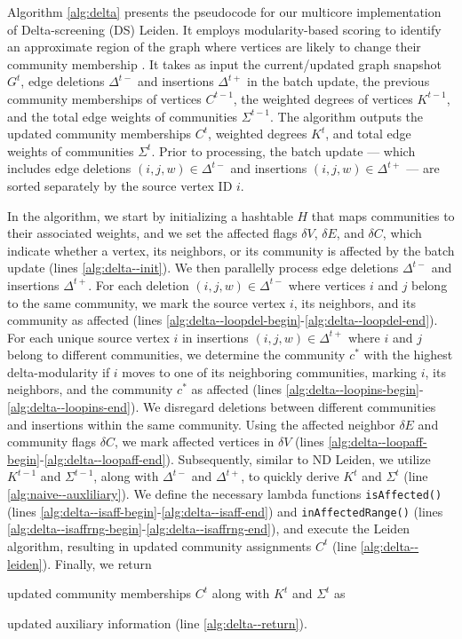 Algorithm \ref{alg:delta} presents the pseudocode for our multicore implementation of Delta-screening (DS) Leiden. It employs modularity-based scoring to identify an approximate region of the graph where vertices are likely to change their community membership \cite{com-zarayeneh21}. It takes as input the current/updated graph snapshot $G^t$, edge deletions $\Delta^{t-}$ and insertions $\Delta^{t+}$ in the batch update, the previous community memberships of vertices $C^{t-1}$, the weighted degrees of vertices $K^{t-1}$, and the total edge weights of communities $\Sigma^{t-1}$. The algorithm outputs the updated community memberships $C^t$, weighted degrees $K^t$, and total edge weights of communities $\Sigma^t$. Prior to processing, the batch update --- which includes edge deletions $(i, j, w) \in \Delta^{t-}$ and insertions $(i, j, w) \in \Delta^{t+}$ --- are sorted separately by the source vertex ID $i$.




In the algorithm, we start by initializing a hashtable $H$ that maps communities to their associated weights, and we set the affected flags $\delta V$, $\delta E$, and $\delta C$, which indicate whether a vertex, its neighbors, or its community is affected by the batch update (lines \ref{alg:delta--init}). We then parallelly process edge deletions $\Delta^{t-}$ and insertions $\Delta^{t+}$. For each deletion $(i, j, w) \in \Delta^{t-}$ where vertices $i$ and $j$ belong to the same community, we mark the source vertex $i$, its neighbors, and its community as affected (lines \ref{alg:delta--loopdel-begin}-\ref{alg:delta--loopdel-end}). For each unique source vertex $i$ in insertions $(i, j, w) \in \Delta^{t+}$ where $i$ and $j$ belong to different communities, we determine the community $c^*$ with the highest delta-modularity if $i$ moves to one of its neighboring communities, marking $i$, its neighbors, and the community $c^*$ as affected (lines \ref{alg:delta--loopins-begin}-\ref{alg:delta--loopins-end}). We disregard deletions between different communities and insertions within the same community. Using the affected neighbor $\delta E$ and community flags $\delta C$, we mark affected vertices in $\delta V$ (lines \ref{alg:delta--loopaff-begin}-\ref{alg:delta--loopaff-end}). Subsequently, similar to ND Leiden, we utilize $K^{t-1}$ and $\Sigma^{t-1}$, along with $\Delta^{t-}$ and $\Delta^{t+}$, to quickly derive $K^t$ and $\Sigma^t$ (line \ref{alg:naive--auxliliary}). We define the necessary lambda functions \texttt{isAffected()} (lines \ref{alg:delta--isaff-begin}-\ref{alg:delta--isaff-end}) and \texttt{inAffectedRange()} (lines \ref{alg:delta--isaffrng-begin}-\ref{alg:delta--isaffrng-end}), and execute the Leiden algorithm, resulting in updated community assignments $C^t$ (line \ref{alg:delta--leiden}). Finally, we return updated community memberships $C^t$ along with $K^t$ and $\Sigma^t$ as updated auxiliary information (line \ref{alg:delta--return}).




